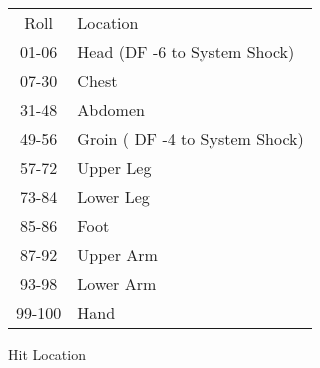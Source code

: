 
\begin{SHTable}
	\begin{tabular}{cl}
	Roll			  &  Location \\
	01-06		   &  Head (DF -6 to System Shock) \\
	07-30		   &  Chest \\
	31-48		   &  Abdomen \\
	49-56		   &  Groin ( DF -4 to System Shock) \\
	57-72		   &  Upper Leg \\
	73-84 			&  Lower Leg \\
	85-86		  		  &  Foot \\
	87-92		   &  Upper Arm \\
	93-98		   &  Lower Arm \\
	99-100			&  Hand \\	 
    \end{tabular}
    \caption{Hit Location}
\end{SHTable}


